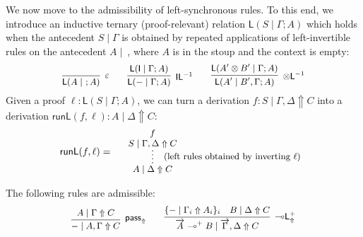 \documentclass[runningheads]{llncs}
\renewcommand{\vec}{\overrightarrow}
\newcommand{\tl}{\otimes \mathsf{L}}
\newcommand{\lleft}{{\multimap}\mathsf{L}}
\newcommand{\pass}{\mathsf{pass}}
\newcommand{\unitl}{\mathsf{IL}}
\newcommand{\otL}{\tl}
\newcommand{\lolliL}{\lleft}
\newcommand{\IL}{\unitl}
\newcommand{\ot}{\otimes}
\newcommand{\lolli}{\multimap}
\newcommand{\I}{\mathsf{I}}
\renewcommand{\L}{\mathsf{L}}
\newcommand{\proofbox}[1]{\begin{tabular}{l} #1 \end{tabular}}
\newcommand{\up}{\Uparrow}
\newcommand{\runL}{\mathsf{runL}}
\begin{document}
We now move to the admissibility of left-synchronous rules. To this end, we introduce an inductive ternary (proof-relevant) relation $\L(S\mid\Gamma;A)$ which holds when the antecedent $S\mid \Gamma$ is obtained by repeated applications of left-invertible rules on the antecedent $A \mid ~$, where $A$ is in the stoup and the context is empty:
\begin{equation*}\small
  \infer[\varepsilon]{\L(A\mid ~ ;A)}{}
  \qquad
  \infer[\IL^{-1}]{\L(-\mid\Gamma;A)}{\L(\I\mid\Gamma;A)}
  \qquad
  \infer[\otL^{-1}]{\L(A'\mid B',\Gamma;A)}{\L(A' \ot B'\mid \Gamma;A)}
\end{equation*}
Given a proof $\ell : \L(S\mid\Gamma;A)$, we can turn a derivation $f : S \mid \Gamma,\Delta \up C$ into a derivation $\runL(f,\ell) : A \mid \Delta \up C$:
 \begin{equation}\label{eq:runL}
  \footnotesize
  \runL(f,\ell) = \quad
  \proofbox{
    \infer*[\;\; (\text{left rules obtained by inverting } \ell)]{A \mid \Delta \up C}{
      \deduce{S \mid \Gamma,\Delta \up C}{f}
    }
    }
 \end{equation}
\begin{proposition}\label{prop:lolliL}
  The following rules are admissible:
  \begin{equation*}\label{eq:passlolliL}
  \small
  \begin{array}{c}
    \infer[\pass_\up]{- \mid A,\Gamma \up C}{
      A \mid \Gamma \up C}
    \qquad
    \infer[\lolliL^+_\up]{\vec{A} \lolli^+ B \mid \vec{\Gamma} , \Delta \up C}{
      \{ - \mid \Gamma_i \up A_i \}_{i}
      &
      B \mid \Delta \up C
    }
  \end{array}
  \end{equation*}
\end{proposition}
\end{document}
